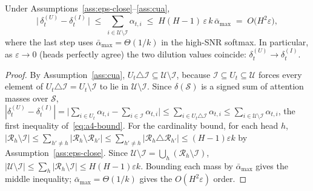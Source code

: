 \begin{proposition}
\label{prop:a4}
Under Assumptions~\ref{ass:eps-close}--\ref{ass:cua},
\begin{equation}
\label{eq:a4-bound}
\bigl|\,\delta^{(U)}_t-\delta^{(I)}_t\,\bigr|
\;\le\;\sum_{i\in\mathcal{U}\setminus\mathcal{I}}\alpha_{t,i}
\;\le\; H(H-1)\,\varepsilon\,k\,\bar\alpha_{\max}
\;=\; O\!\bigl(H^2\varepsilon\bigr),
\end{equation}
where the last step uses $\bar\alpha_{\max}=\Theta(1/k)$ in the high-SNR
softmax. In particular, as $\varepsilon\to0$ (heads perfectly agree) the two
dilution values coincide: $\delta^{(U)}_t\to\delta^{(I)}_t$.
\end{proposition}

\begin{proof}
By Assumption~\ref{ass:cua}, $U_t\triangle\mathcal{I}\subseteq\mathcal{U}\setminus\mathcal{I}$,
because $\mathcal{I}\subseteq U_t\subseteq\mathcal{U}$ forces every element of
$U_t\triangle\mathcal{I}=U_t\setminus\mathcal{I}$ to lie in
$\mathcal{U}\setminus\mathcal{I}$. Since $\delta(\mathcal{S})$ is a signed sum of
attention masses over $\mathcal{S}$,
$|\delta^{(U)}_t-\delta^{(I)}_t|
=\bigl|\sum_{i\in U_t}\alpha_{t,i}-\sum_{i\in\mathcal{I}}\alpha_{t,i}\bigr|
\le\sum_{i\in U_t\triangle\mathcal{I}}\alpha_{t,i}
\le\sum_{i\in\mathcal{U}\setminus\mathcal{I}}\alpha_{t,i}$,
the first inequality of~\eqref{eq:a4-bound}. For the cardinality bound, for each
head $h$,
$|\mathcal{R}_h\setminus\mathcal{I}|\le\sum_{h'\ne h}|\mathcal{R}_h\setminus\mathcal{R}_{h'}|
\le\sum_{h'\ne h}|\mathcal{R}_h\triangle\mathcal{R}_{h'}|\le(H-1)\varepsilon k$
by Assumption~\ref{ass:eps-close}. Since
$\mathcal{U}\setminus\mathcal{I}=\bigcup_h(\mathcal{R}_h\setminus\mathcal{I})$,
$|\mathcal{U}\setminus\mathcal{I}|\le\sum_h|\mathcal{R}_h\setminus\mathcal{I}|\le H(H-1)\varepsilon k$.
Bounding each mass by $\bar\alpha_{\max}$ gives the middle inequality;
$\bar\alpha_{\max}=\Theta(1/k)$ gives the $O(H^2\varepsilon)$ order.
\end{proof}

